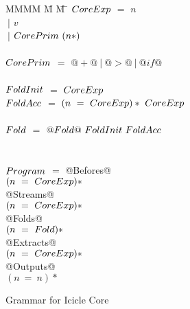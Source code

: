 
\begin{figure}

\begin{tabbing}
MMMM \= M \= M \= \kill
$\mit{CoreExp}$
    \> $=$  \> $n$          \\
    \> $~|$ \> $v$ \\
    \> $~|$ \> $\mit{CorePrim}~(n*)$ \\
\\
$\mit{CorePrim}$
    \> $=$  \> $@+@~|~@>@~|~@if@$ \\
\\
$\mit{FoldInit}$
    \> $=$  \> $\mit{CoreExp}$ \\
$\mit{FoldAcc}$
    \> $=$  \> $(n~=~\mit{CoreExp})*~\mit{CoreExp}$ \\
\\
$\mit{Fold}$
    \> $=$  \> $@Fold@~\mit{FoldInit}~\mit{FoldAcc}$ \\
\\
\\
$\mit{Program}$
    \> $=$  \> @Befores@ \\
    \>      \> \> $(n~=~\mit{CoreExp})*$ \\
    \>      \> @Streams@ \\
    \>      \> \> $(n~=~\mit{CoreExp})*$ \\
    \>      \> @Folds@ \\
    \>      \> \> $(n~=~\mit{Fold})*$ \\
    \>      \> @Extracts@ \\
    \>      \> \> $(n~=~\mit{CoreExp})*$ \\
    \>      \> @Outputs@ \\
    \>      \> \> $(n~=~n)*$ \\
\end{tabbing}


\caption{Grammar for Icicle Core}
\label{fig:core:grammar}
\end{figure}

